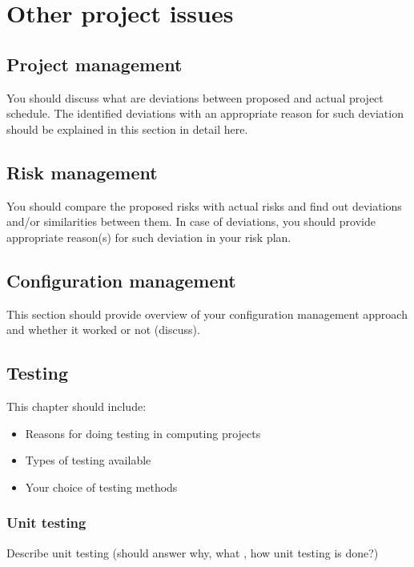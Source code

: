 \chapter{Other project issues} %
\label{cha:others}

\section{Project management} %
\label{sec:project_management}
You should discuss what are deviations between proposed and actual project schedule. The identified deviations with an appropriate reason for such deviation should be explained in this section in detail here.

\section{Risk management} %
\label{sec:risk_management}
You should compare the proposed risks with actual risks and find out deviations and/or similarities between them. In case of deviations, you should provide appropriate reason(s) for such deviation in your risk plan.
\section{Configuration management} %
\label{sec:configuration_management}
This section should provide overview of your configuration management approach and whether it worked or not (discuss).
\section{Testing} %
\label{sec:testing}
This chapter should include:
\begin{itemize}
  \item Reasons for doing testing in computing projects
  \item Types of testing available
  \item Your choice of testing methods
\end{itemize}

\subsection{Unit testing} %
\label{sub:unit_testing}
Describe unit testing (should answer why, what , how unit testing is done?)

